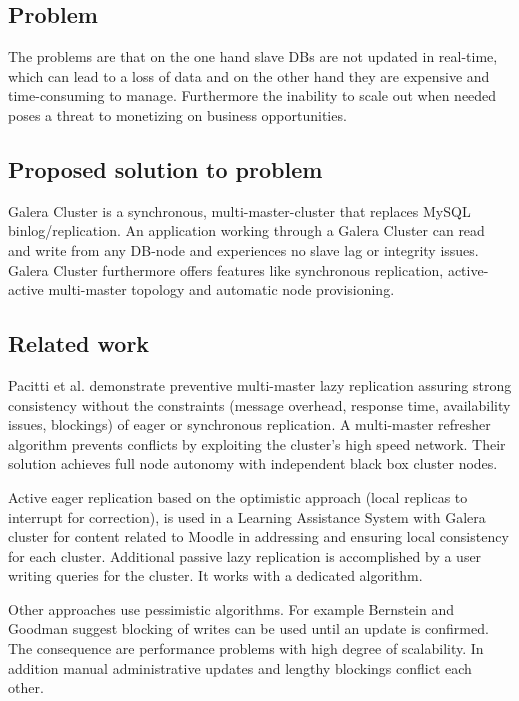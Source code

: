 \documentclass{sig-alternate}
\begin{document}
\bigskip

\subsection{Problem}
The problems are that on the one hand slave DBs are not updated in real-time, which can lead to a loss of data and on the other hand they are expensive and time-consuming to manage. Furthermore the inability to scale out when needed poses a threat to monetizing on business opportunities.

\subsection{Proposed solution to problem}
Galera Cluster is a synchronous, multi-master-cluster that replaces MySQL binlog/replication. An application working through a Galera Cluster can read and write from any DB-node and experiences no slave lag or integrity issues. Galera Cluster furthermore offers features like synchronous replication, active-active multi-master topology and automatic node provisioning.

\subsection{Related work}
Pacitti et al. \cite{pacitti2003preventive} demonstrate preventive multi-master lazy replication assuring strong consistency without the constraints (message overhead, response time, availability issues, blockings) of eager or synchronous replication. A multi-master refresher algorithm prevents conflicts by exploiting the cluster’s high speed network. Their solution achieves full node autonomy with independent black box cluster nodes.

Active eager replication based on the optimistic approach (local replicas to interrupt for correction), is used in a Learning Assistance System \cite{gautam2016multi} with Galera cluster for content related to Moodle in addressing and ensuring local consistency for each cluster. Additional passive lazy replication is accomplished by a user writing queries for the cluster. It works with a dedicated algorithm.

Other approaches use pessimistic algorithms. For example Bernstein and Goodman \cite{bernstein1985serializability} suggest blocking of writes can be used until an update is confirmed. The consequence are performance problems with high degree of scalability. In addition manual administrative updates and lengthy blockings conflict each other.
\end{document}
